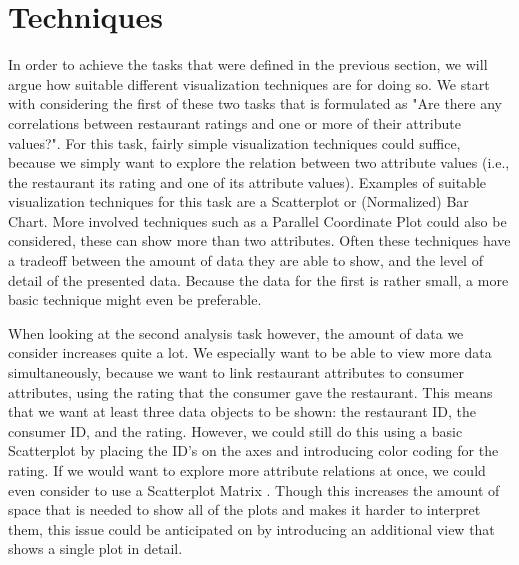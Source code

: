 \section{Techniques}\label{sec:techniques}





In order to achieve the tasks that were defined in the previous section, we will argue how suitable different visualization techniques are for doing so. We start with considering the first of these two tasks that is formulated as "Are there any correlations between restaurant ratings and one or more of their attribute values?". For this task, fairly simple visualization techniques could suffice, because we simply want to explore the relation between two attribute values (i.e., the restaurant its rating and one of its attribute values). Examples of suitable visualization techniques for this task are a Scatterplot \cite{D3scatterplot} or (Normalized) Bar Chart. More involved techniques such as a Parallel Coordinate\cite{} Plot could also be considered, these can show more than two attributes. Often these techniques have a tradeoff between the amount of data they are able to show, and the level of detail of the presented data. Because the data for the first is rather small, a more basic technique might even be preferable.

When looking at the second analysis task however, the amount of data we consider increases quite a lot. We especially want to be able to view more data simultaneously, because we want to link restaurant attributes to consumer attributes, using the rating that the consumer gave the restaurant. This means that we want at least three data objects to be shown: the restaurant ID, the consumer ID, and the rating. However, we could still do this using a basic Scatterplot by placing the ID's on the axes and introducing color coding for the rating. If we would want to explore more attribute relations at once, we could even consider to use a Scatterplot Matrix \cite{D3scattermatrix}. Though this increases the amount of space that is needed to show all of the plots and makes it harder to interpret them, this issue could be anticipated on by introducing an additional view that shows a single plot in detail.

